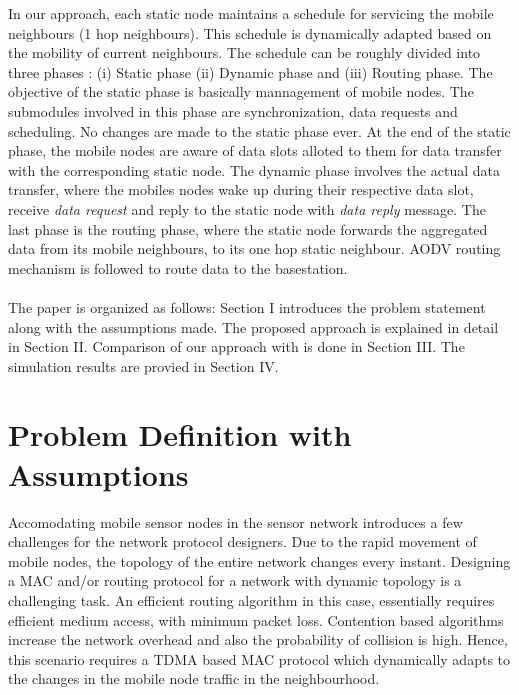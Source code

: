 \documentclass[a4paper, conference, 10pt]{IEEEtran}
\begin{document}
In our approach, each static node maintains a schedule for servicing the mobile neighbours (1 hop neighbours). This schedule is dynamically adapted based on the mobility of current neighbours. The schedule can be roughly divided into three phases : (i) Static phase (ii) Dynamic phase and (iii) Routing phase. The objective of the static phase is basically mannagement of mobile nodes. The submodules involved in this phase are synchronization, data requests and scheduling. No changes are made to the static phase ever. At the end of the static phase, the mobile nodes are aware of data slots alloted to them for data transfer with the corresponding static node. The dynamic phase involves the actual data transfer, where the mobiles nodes wake up during their respective data slot, receive \emph{data request} and reply to the static node with \emph{data reply} message. The last phase is the routing phase, where the static node forwards the aggregated data from its mobile neighbours, to its one hop static neighbour. AODV routing mechanism \cite{aodv} is followed to route data to the basestation.\\\\

The paper is organized as follows: Section I introduces the problem statement along with the assumptions made. The proposed approach is explained in detail in Section II. Comparison of our approach with \cite{hmac} is done in Section III. The simulation results are provied in Section IV. 

\section{Problem Definition with Assumptions}
Accomodating mobile sensor nodes in the sensor network introduces a few challenges for the network protocol designers. Due to the rapid movement of mobile nodes, the topology of the entire network changes every instant. Designing a MAC and/or routing protocol for a network with dynamic topology is a challenging task. An efficient routing algorithm in this case, essentially requires efficient medium access, with minimum packet loss. Contention based algorithms increase the network overhead and also the probability of collision is high. Hence, this scenario requires a TDMA based MAC protocol which dynamically adapts to the changes in the mobile node traffic in the neighbourhood.  %
\end{document}
